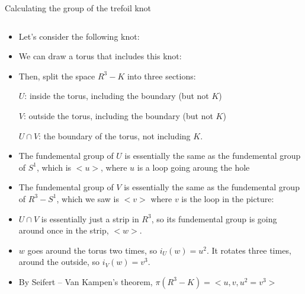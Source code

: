 \documentclass[8pt]{beamer}
\begin{document}
  \begin{frame}
    Calculating the group of the trefoil knot
    \begin{columns}
      \begin{column}[T]{0.5\textwidth}
        \begin{itemize}
          \item Let's consider the following knot:
          \item We can draw a torus that includes this knot:
          \item Then, split the space $R^3 - K$ into three sections:
          
            $U$: inside the torus, including the boundary (but not $K$)

            $V$: outside the torus, including the boundary (but not $K$)

            $U \cap V$: the boundary of the torus, not including $K$.

          \item The fundemental group of $U$ is essentially the same as the fundemental
          group of $S^1$, which is $<u>$, where $u$ is a loop going aroung the hole

          \item The fundemental group of $V$ is essentially the same as the fundemental group
            of $R^3 - S^1$, which we saw is $<v>$ where $v$ is the loop in the picture:

          \item $U \cap V$ is essentially just a strip in $R^3$, so its
            fundemental group is going around once in the strip, $<w>$.

          \item $w$ goes around the torus two times, so $i_U(w) = u^2$. It rotates three times,
            around the outside, so $i_V(w) = v^3$.

          \item By Seifert -- Van Kampen's theorem, $\pi(R^3 - K) = <u,v,u^2 = v^3>$
        \end{itemize}
      \end{column}
    \end{columns}
  \end{frame}
\end{document}
